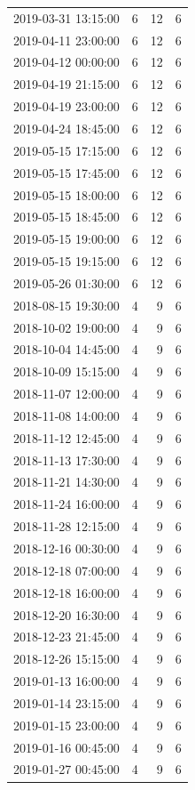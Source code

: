 \begin{tabular}{lrrr}
2019-03-31 13:15:00 & 6 & 12 & 6 \\
2019-04-11 23:00:00 & 6 & 12 & 6 \\
2019-04-12 00:00:00 & 6 & 12 & 6 \\
2019-04-19 21:15:00 & 6 & 12 & 6 \\
2019-04-19 23:00:00 & 6 & 12 & 6 \\
2019-04-24 18:45:00 & 6 & 12 & 6 \\
2019-05-15 17:15:00 & 6 & 12 & 6 \\
2019-05-15 17:45:00 & 6 & 12 & 6 \\
2019-05-15 18:00:00 & 6 & 12 & 6 \\
2019-05-15 18:45:00 & 6 & 12 & 6 \\
2019-05-15 19:00:00 & 6 & 12 & 6 \\
2019-05-15 19:15:00 & 6 & 12 & 6 \\
2019-05-26 01:30:00 & 6 & 12 & 6 \\
2018-08-15 19:30:00 & 4 & 9 & 6 \\
2018-10-02 19:00:00 & 4 & 9 & 6 \\
2018-10-04 14:45:00 & 4 & 9 & 6 \\
2018-10-09 15:15:00 & 4 & 9 & 6 \\
2018-11-07 12:00:00 & 4 & 9 & 6 \\
2018-11-08 14:00:00 & 4 & 9 & 6 \\
2018-11-12 12:45:00 & 4 & 9 & 6 \\
2018-11-13 17:30:00 & 4 & 9 & 6 \\
2018-11-21 14:30:00 & 4 & 9 & 6 \\
2018-11-24 16:00:00 & 4 & 9 & 6 \\
2018-11-28 12:15:00 & 4 & 9 & 6 \\
2018-12-16 00:30:00 & 4 & 9 & 6 \\
2018-12-18 07:00:00 & 4 & 9 & 6 \\
2018-12-18 16:00:00 & 4 & 9 & 6 \\
2018-12-20 16:30:00 & 4 & 9 & 6 \\
2018-12-23 21:45:00 & 4 & 9 & 6 \\
2018-12-26 15:15:00 & 4 & 9 & 6 \\
2019-01-13 16:00:00 & 4 & 9 & 6 \\
2019-01-14 23:15:00 & 4 & 9 & 6 \\
2019-01-15 23:00:00 & 4 & 9 & 6 \\
2019-01-16 00:45:00 & 4 & 9 & 6 \\
2019-01-27 00:45:00 & 4 & 9 & 6 \\

\end{tabular}
